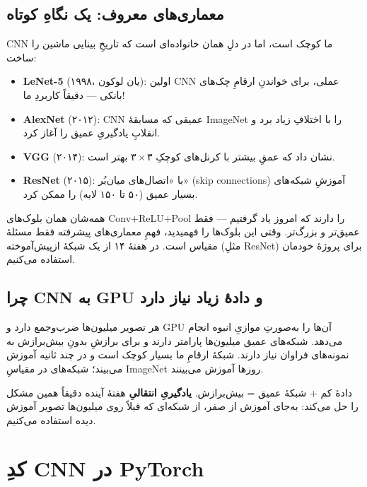 \documentclass[12pt,a4paper]{article}
\begin{document}
\subsection{معماری‌های معروف: یک نگاهِ کوتاه}

CNNِ ما کوچک است، اما در دلِ همان خانواده‌ای است که تاریخِ بینایی ماشین را ساخت:

\begin{itemize}
  \item \textbf{LeNet-5} (۱۹۹۸، یان لوکون): اولین CNNِ عملی، برای خواندنِ ارقامِ چک‌های بانکی — دقیقاً کاربردِ ما!
  \item \textbf{AlexNet} (۲۰۱۲): CNNِ عمیقی که مسابقهٔ ImageNet را با اختلافِ زیاد برد و انقلابِ یادگیریِ عمیق را آغاز کرد.
  \item \textbf{VGG} (۲۰۱۴): نشان داد که عمقِ بیشتر با کرنل‌های کوچکِ $۳\times۳$ بهتر است.
  \item \textbf{ResNet} (۲۰۱۵): با «اتصال‌های میان‌بُر» (skip connections) آموزشِ شبکه‌های بسیار عمیق (۵۰ تا ۱۵۰ لایه) را ممکن کرد.
\end{itemize}

\begin{nokte}
همه‌شان همان بلوک‌های Conv+ReLU+Pool را دارند که امروز یاد گرفتیم — فقط عمیق‌تر و بزرگ‌تر. وقتی این بلوک‌ها را فهمیدید، فهمِ معماری‌های پیشرفته فقط مسئلهٔ مقیاس است. در هفتهٔ ۱۴ از یک شبکهٔ از‌پیش‌آموخته (مثلِ ResNet) برای پروژهٔ خودمان استفاده می‌کنیم.
\end{nokte}

\subsection{چرا CNN به GPU و دادهٔ زیاد نیاز دارد}

هر تصویر میلیون‌ها ضرب‌وجمع دارد و GPU آن‌ها را به‌صورتِ موازیِ انبوه انجام می‌دهد. شبکه‌های عمیق میلیون‌ها پارامتر دارند و برای برازشِ بدونِ بیش‌برازش به نمونه‌های فراوان نیاز دارند. شبکهٔ ارقامِ ما بسیار کوچک است و در چند ثانیه آموزش می‌بیند؛ شبکه‌های در مقیاسِ ImageNet روزها آموزش می‌بینند.

\begin{hoshdar}
دادهٔ کم + شبکهٔ عمیق = بیش‌برازش. \textbf{یادگیریِ انتقالیِ} هفتهٔ آینده دقیقاً همین مشکل را حل می‌کند: به‌جای آموزش از صفر، از شبکه‌ای که قبلاً روی میلیون‌ها تصویر آموزش دیده استفاده می‌کنیم.
\end{hoshdar}

\section{کدِ CNN در PyTorch}
\end{document}
